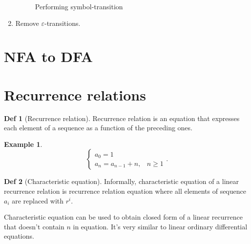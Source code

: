 \documentclass[a4paper]{article}
\theoremstyle{definition}
\newtheorem{definition}{Def}
\newtheorem{example}{Example}[section]
\begin{document}
\begin{enumerate}
\begin{figure}[!htbp]
    \caption{Performing symbol-transition}%
    \label{fig:enfa-to-nfa-3}
  \end{figure}
  \item Remove \(\varepsilon\)-transitions.
\end{enumerate}

\section{NFA to DFA}


\section{Recurrence relations}

\begin{definition}[Recurrence relation]
  Recurrence relation is an equation
  that expresses each element of a sequence
  as a function of the preceding ones.
\end{definition}

\begin{example}
  \[
  \begin{cases}
    a_0 = 1 \\
    a_n = a_{n - 1} + n, & n \ge 1
  \end{cases}
  .\]
\end{example}

\begin{definition}[Characteristic equation]
  Informally, characteristic equation of a linear recurrence relation
  is recurrence relation equation
  where all elements of sequence \(a_i\) are replaced with \(r^i\).
\end{definition}

Characteristic equation can be used to obtain closed form of
a linear recurrence that doesn't contain \(n\) in equation.
It's very similar to linear ordinary differential equations.
\end{document}
